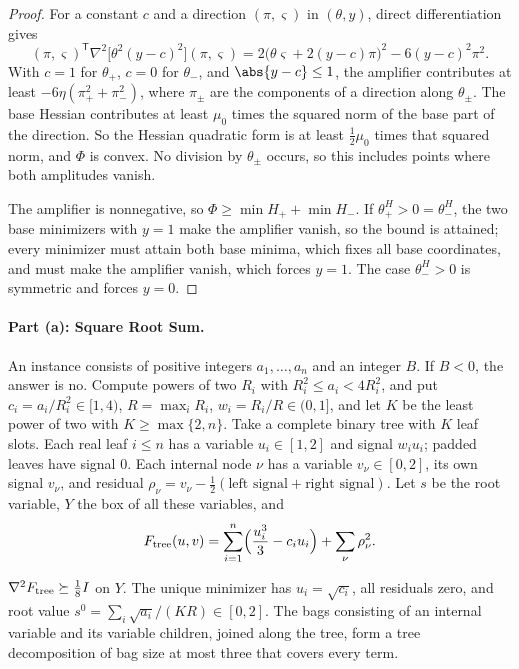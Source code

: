 \begin{proof}
For a constant $c$ and a direction $(\pi,\varsigma)$ in $(\theta,y)$, direct
differentiation gives
\[
 (\pi,\varsigma)^{\mathsf T}\nabla^2\bigl[\theta^2(y-c)^2\bigr](\pi,\varsigma)
 =2\bigl(\theta\varsigma+2(y-c)\pi\bigr)^2-6(y-c)^2\pi^2 .
\]
With $c=1$ for $\theta_+$, $c=0$ for $\theta_-$, and $\abs{y-c}\le1$, the
amplifier contributes at least $-6\eta(\pi_+^2+\pi_-^2)$, where $\pi_\pm$ are
the components of a direction along $\theta_\pm$. The base Hessian
contributes at least $\mu_0$ times the squared norm of the base part of the
direction. So the Hessian quadratic form is at least $\frac12\mu_0$ times
that squared norm, and $\Phi$ is convex. No division by $\theta_\pm$ occurs,
so this includes points where both amplitudes vanish.

The amplifier is nonnegative, so $\Phi\ge\min H_++\min H_-$. If
$\theta_+^H>0=\theta_-^H$, the two base minimizers with $y=1$ make the
amplifier vanish, so the bound is attained; every minimizer must attain both
base minima, which fixes all base coordinates, and must make the amplifier
vanish, which forces $y=1$. The case $\theta_-^H>0$ is symmetric and forces
$y=0$.
\end{proof}

\paragraph{Part (a): Square Root Sum.}
An instance consists of positive integers $a_1,\ldots,a_n$ and an integer
$B$. If $B<0$, the answer is no. Compute powers of two $R_i$ with
$R_i^2\le a_i<4R_i^2$, and put $c_i=a_i/R_i^2\in[1,4)$, $R=\max_iR_i$,
$w_i=R_i/R\in(0,1]$, and let $K$ be the least power of two with
$K\ge\max\{2,n\}$. Take a complete binary tree with $K$ leaf slots. Each real
leaf $i\le n$ has a variable $u_i\in[1,2]$ and signal $w_iu_i$; padded leaves
have signal $0$. Each internal node $\nu$ has a variable $v_\nu\in[0,2]$,
its own signal $v_\nu$, and residual
$\rho_\nu=v_\nu-\frac12(\text{left signal}+\text{right signal})$. Let $s$ be
the root variable, $Y$ the box of all these variables, and
\[
 F_{\rm tree}(u,v)=\sum_{i=1}^n\Bigl(\frac{u_i^3}3-c_iu_i\Bigr)+\sum_\nu\rho_\nu^2 .
\]

\begin{lemma}\label{lem:lim:tree}
$\nabla^2F_{\rm tree}\succeq\frac18I$ on $Y$. The unique minimizer has
$u_i=\sqrt{c_i}$, all residuals zero, and root value
$s^0=\sum_i\sqrt{a_i}/(KR)\in[0,2]$. The bags consisting of an internal
variable and its variable children, joined along the tree, form a tree
decomposition of bag size at most three that covers every term.
\end{lemma}

